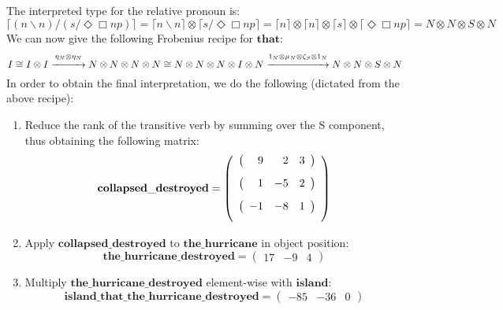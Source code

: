 \documentclass[]{article}
\newcommand{\Wv}[1]{\mathbf{#1}}
\newcommand{\bs}{\backslash}
\newcommand{\F}[1]{\lceil #1 \rceil}
\begin{document}
\subsection{}
The interpreted type for the relative pronoun is:
\[ \F{(n\bs n)/(s/\Diamond\Box np)} = \F{n\bs n} \otimes \F{s/\Diamond\Box np} = 
\F{n} \otimes \F{n} \otimes \F{s} \otimes \F{\Diamond\Box np} =
N \otimes N \otimes S \otimes N \]
We can now give the following Frobenius recipe for $\Wv{that}$:
\[ I \cong I \otimes I \overset{\eta_N \otimes \eta_N}{\xrightarrow{\hspace*{1cm}}} N \otimes N \otimes N \otimes N \cong N \otimes N \otimes N \otimes I \otimes N \overset{1_N \otimes \mu_N \otimes \zeta_S \otimes 1_N}{\xrightarrow{\hspace*{2cm}}} N \otimes N \otimes S \otimes N \] 
In order to obtain the final interpretation, we do the following (dictated from the above recipe):
\begin{enumerate}
\item Reduce the rank of the transitive verb by summing over the S component, thus obtaining the following matrix:
\[
\Wv{collapsed\_destroyed} =
\left(\begin{array}{ccc}
\left(\begin{array}{rrr}\textcolor{white}{-}9 & \textcolor{white}{-}2 & 3 \end{array}\right)\\[2ex]
\left(\begin{array}{rrr}\textcolor{white}{-}1 & -5 & 2 \end{array}\right)\\[2ex]
\left(\begin{array}{rrr}-1 & -8 & 1 \end{array}\right)\\[2ex]
\end{array}
\right)
\]
\item Apply $\Wv{collapsed\_destroyed}$ to $\Wv{the\_hurricane}$ in object position:
\[
\Wv{the\_hurricane\_destroyed} =
\left(\begin{array}{ccc} 17 & -9 & 4 \end{array}\right)
\]
\item Multiply $\Wv{the\_hurricane\_destroyed}$ element-wise with $\Wv{island}$:
\[
\Wv{island\_that\_the\_hurricane\_destroyed} =
\left(\begin{array}{ccc} -85 & -36 & 0 \end{array}\right)
\]
\end{enumerate}
\end{document}
